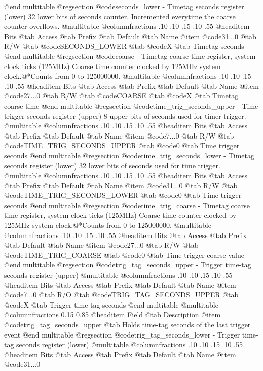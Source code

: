 @end multitable
@regsection @code{seconds_lower} - Timetag seconds register (lower)
32 lower bits of seconds counter. Incremented everytime the coarse counter overflows.
@multitable @columnfractions .10 .10 .15 .10 .55
@headitem Bits @tab Access @tab Prefix @tab Default @tab Name
@item @code{31...0}
@tab R/W @tab
@code{SECONDS_LOWER}
@tab @code{X} @tab 
Timetag seconds
@end multitable
@regsection @code{coarse} - Timetag coarse time register, system clock ticks (125MHz)
Coarse time counter clocked by 125MHz system clock.@*Counts from 0 to 125000000.
@multitable @columnfractions .10 .10 .15 .10 .55
@headitem Bits @tab Access @tab Prefix @tab Default @tab Name
@item @code{27...0}
@tab R/W @tab
@code{COARSE}
@tab @code{X} @tab 
Timetag coarse time
@end multitable
@regsection @code{time_trig_seconds_upper} - Time trigger seconds register (upper)
8 upper bits of seconds used for timer trigger.
@multitable @columnfractions .10 .10 .15 .10 .55
@headitem Bits @tab Access @tab Prefix @tab Default @tab Name
@item @code{7...0}
@tab R/W @tab
@code{TIME_TRIG_SECONDS_UPPER}
@tab @code{0} @tab 
Time trigger seconds
@end multitable
@regsection @code{time_trig_seconds_lower} - Timetag seconds register (lower)
32 lower bits of seconds used for time trigger.
@multitable @columnfractions .10 .10 .15 .10 .55
@headitem Bits @tab Access @tab Prefix @tab Default @tab Name
@item @code{31...0}
@tab R/W @tab
@code{TIME_TRIG_SECONDS_LOWER}
@tab @code{0} @tab 
Time trigger seconds
@end multitable
@regsection @code{time_trig_coarse} - Timetag coarse time register, system clock ticks (125MHz)
Coarse time counter clocked by 125MHz system clock.@*Counts from 0 to 125000000.
@multitable @columnfractions .10 .10 .15 .10 .55
@headitem Bits @tab Access @tab Prefix @tab Default @tab Name
@item @code{27...0}
@tab R/W @tab
@code{TIME_TRIG_COARSE}
@tab @code{0} @tab 
Time trigger coarse value
@end multitable
@regsection @code{trig_tag_seconds_upper} - Trigger time-tag seconds register (upper)
@multitable @columnfractions .10 .10 .15 .10 .55
@headitem Bits @tab Access @tab Prefix @tab Default @tab Name
@item @code{7...0}
@tab R/O @tab
@code{TRIG_TAG_SECONDS_UPPER}
@tab @code{X} @tab 
Trigger time-tag seconds
@end multitable
@multitable @columnfractions 0.15 0.85
@headitem Field @tab Description
@item @code{trig_tag_seconds_upper} @tab Holds time-tag seconds of the last trigger event
@end multitable
@regsection @code{trig_tag_seconds_lower} - Trigger time-tag seconds register (lower)
@multitable @columnfractions .10 .10 .15 .10 .55
@headitem Bits @tab Access @tab Prefix @tab Default @tab Name
@item @code{31...0}
